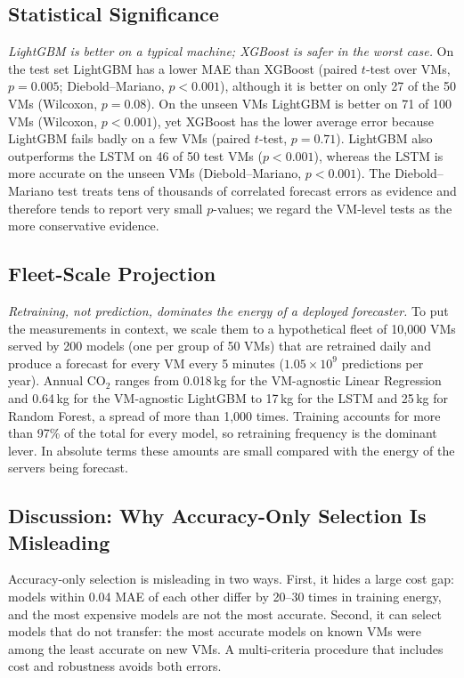 \documentclass[conference,letterpaper,10pt]{IEEEtran}
\begin{document}
\subsection{Statistical Significance}
\textit{LightGBM is better on a typical machine; XGBoost is safer in the worst case.} On the test set LightGBM has a lower MAE than XGBoost (paired $t$-test over VMs, $p=0.005$; Diebold--Mariano, $p<0.001$), although it is better on only 27 of the 50 VMs (Wilcoxon, $p=0.08$). On the unseen VMs LightGBM is better on 71 of 100 VMs (Wilcoxon, $p<0.001$), yet XGBoost has the lower average error because LightGBM fails badly on a few VMs (paired $t$-test, $p=0.71$). LightGBM also outperforms the LSTM on 46 of 50 test VMs ($p<0.001$), whereas the LSTM is more accurate on the unseen VMs (Diebold--Mariano, $p<0.001$). The Diebold--Mariano test treats tens of thousands of correlated forecast errors as evidence and therefore tends to report very small $p$-values; we regard the VM-level tests as the more conservative evidence.

\subsection{Fleet-Scale Projection}
\textit{Retraining, not prediction, dominates the energy of a deployed forecaster.} To put the measurements in context, we scale them to a hypothetical fleet of 10{,}000 VMs served by 200 models (one per group of 50 VMs) that are retrained daily and produce a forecast for every VM every 5 minutes ($1.05\times10^9$ predictions per year). Annual CO$_2$ ranges from 0.018\,kg for the VM-agnostic Linear Regression and 0.64\,kg for the VM-agnostic LightGBM to 17\,kg for the LSTM and 25\,kg for Random Forest, a spread of more than 1{,}000 times. Training accounts for more than 97\% of the total for every model, so retraining frequency is the dominant lever. In absolute terms these amounts are small compared with the energy of the servers being forecast.


\subsection{Discussion: Why Accuracy-Only Selection Is Misleading}
\label{sec:discussion}
Accuracy-only selection is misleading in two ways. First, it hides a large cost gap: models within 0.04 MAE of each other differ by 20--30 times in training energy, and the most expensive models are not the most accurate. Second, it can select models that do not transfer: the most accurate models on known VMs were among the least accurate on new VMs. A multi-criteria procedure that includes cost and robustness avoids both errors.
\end{document}
